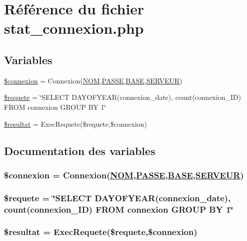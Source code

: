 \hypertarget{stat__connexion_8php}{
\section{R\'{e}f\'{e}rence du fichier stat\_\-connexion.php}
\label{stat__connexion_8php}
}
\subsection*{Variables}
\begin{CompactItemize}
\item 
\hyperlink{stat__connexion_8php_a0}{\$connexion} = Connexion(\hyperlink{pma__connect_8php_a0}{NOM},\hyperlink{pma__connect_8php_a1}{PASSE},\hyperlink{pma__connect_8php_a3}{BASE},\hyperlink{pma__connect_8php_a2}{SERVEUR})
\item 
\hyperlink{stat__connexion_8php_a1}{\$requete} = \char`\"{}SELECT DAYOFYEAR(connexion\_\-date), count(connexion\_\-ID) FROM connexion GROUP BY 1\char`\"{}
\item 
\hyperlink{stat__connexion_8php_a2}{\$resultat} = Exec\-Requete(\$requete,\$connexion)
\end{CompactItemize}


\subsection{Documentation des variables}
\hypertarget{stat__connexion_8php_a0}{
\subsubsection[\$connexion]{\setlength{\rightskip}{0pt plus 5cm}\$connexion = Connexion(\hyperlink{pma__connect_8php_a0}{NOM},\hyperlink{pma__connect_8php_a1}{PASSE},\hyperlink{pma__connect_8php_a3}{BASE},\hyperlink{pma__connect_8php_a2}{SERVEUR})}}
\label{stat__connexion_8php_a0}


\hypertarget{stat__connexion_8php_a1}{
\subsubsection[\$requete]{\setlength{\rightskip}{0pt plus 5cm}\$requete = \char`\"{}SELECT DAYOFYEAR(connexion\_\-date), count(connexion\_\-ID) FROM connexion GROUP BY 1\char`\"{}}}
\label{stat__connexion_8php_a1}


\hypertarget{stat__connexion_8php_a2}{
\subsubsection[\$resultat]{\setlength{\rightskip}{0pt plus 5cm}\$resultat = Exec\-Requete(\$requete,\$connexion)}}
\label{stat__connexion_8php_a2}


